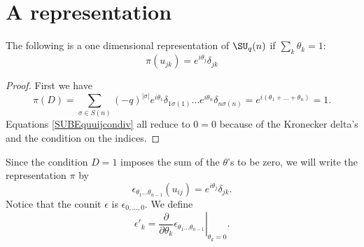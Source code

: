 \section{A representation}

\begin{proposition}     \label{PropReprezThetasuqn}
    The following is a one dimensional representation of $\SU_q(n)$ if $\sum_k\theta_k=1$:
    \begin{equation}
        \pi(u_{jk})= e^{i\theta_j}\delta_{jk}
    \end{equation}
\end{proposition}

\begin{proof}
    First we have
    \begin{equation}
        \pi(D)=\sum_{\sigma\in S(n)}(-q)^{| \sigma |} e^{i\theta_1}\delta_{1\sigma(1)}\ldots e^{i\theta_n}\delta_{n\sigma(n)}= e^{i(\theta_1+\ldots+\theta_n)}=1.
    \end{equation}
    Equations \eqref{SUBEquuijcondiv} all reduce to $0=0$ because of the Kronecker delta's and the condition on the indices.
\end{proof}

Since the condition $D=1$ imposes the sum of the $\theta$'s to be zero, we will write the representation $\pi$ by
\begin{equation}
    \epsilon_{\theta_1\ldots\theta_{n-1}}(u_{ij})= e^{i\theta_j}\delta_{jk}.
\end{equation}
Notice that the counit $\epsilon$ is $\epsilon_{0,\ldots,0}$. We define
\begin{equation}
    \epsilon'_k=\left.\frac{ \partial  }{ \partial \theta_k }\epsilon_{\theta_1\ldots\theta_{n-1}}\right|_{\theta_k=0}.
\end{equation}

